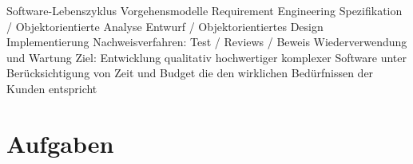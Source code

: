 \documentclass{lehramt-informatik}
\begin{document}
Software-Lebenszyklus
Vorgehensmodelle
Requirement Engineering
Spezifikation / Objektorientierte Analyse
Entwurf / Objektorientiertes Design
Implementierung
Nachweisverfahren: Test / Reviews / Beweis
Wiederverwendung und Wartung
Ziel:
Entwicklung qualitativ hochwertiger komplexer Software
unter Berücksichtigung von Zeit und Budget
die den wirklichen Bedürfnissen der Kunden entspricht


\chapter{Aufgaben}

\literatur
\end{document}
